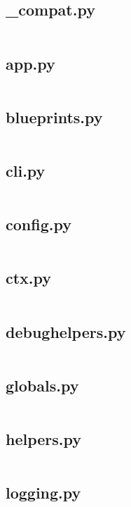 \documentclass{article}
\begin{document}
\subsection{\_compat.py}
\inputminted{python}{/tmp/flask/flask/_compat.py}
\newpage

\subsection{app.py}
\inputminted{python}{/tmp/flask/flask/app.py}
\newpage

\subsection{blueprints.py}
\inputminted{python}{/tmp/flask/flask/blueprints.py}
\newpage

\subsection{cli.py}
\inputminted{python}{/tmp/flask/flask/cli.py}
\newpage

\subsection{config.py}
\inputminted{python}{/tmp/flask/flask/config.py}
\newpage

\subsection{ctx.py}
\inputminted{python}{/tmp/flask/flask/ctx.py}
\newpage

\subsection{debughelpers.py}
\inputminted{python}{/tmp/flask/flask/debughelpers.py}
\newpage

\subsection{globals.py}
\inputminted{python}{/tmp/flask/flask/globals.py}
\newpage

\subsection{helpers.py}
\inputminted{python}{/tmp/flask/flask/helpers.py}
\newpage

\subsection{logging.py}
\inputminted{python}{/tmp/flask/flask/logging.py}
\newpage
\end{document}
